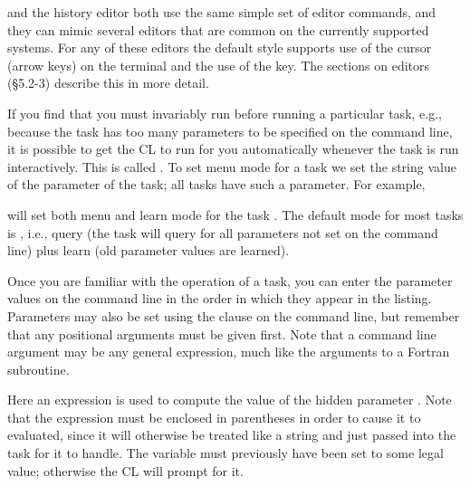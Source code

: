  and the history editor  both
use the same simple set of editor commands, and they can mimic several 
editors that are common on the currently supported systems.  For any
of these editors the default style supports use of the cursor (arrow keys)
on the terminal and the use of the  key.  The sections on
editors (\S 5.2-3) describe this in more detail.

If you find that you must invariably run  before running
a particular task, e.g., because the task has too many parameters to be
specified on the command line, it is possible to get the CL to run
 for you automatically whenever the task is run interactively.
This is called .  To set menu mode for a task we
set the string value of the  parameter of the task; all
tasks have such a parameter.  For example,

\begin{quotation}\noindent
{} 
\end{quotation}

\noindent
will set both menu and learn mode for the task .
The default mode for most tasks is , i.e., query (the task
will query for all parameters not set on the command line) plus learn
(old parameter values are learned).

Once you are familiar with the operation of a task, you can
enter the parameter values on the command line in the
order in which they appear in the  listing.
Parameters may also be set using the  clause on the
command line, but remember that any positional arguments must be given first.
Note that a command line argument may be any general expression, much like
the arguments to a Fortran subroutine.

\begin{quotation} \noindent
{} 
\end{quotation}

\noindent
Here an expression is used to compute the value of the
hidden parameter . Note that the expression must
be enclosed in parentheses in order to cause it to evaluated, since it
will otherwise be treated like a string and just passed into the task
for it to handle.  The variable  must previously have 
been set to some legal value; otherwise the CL will prompt for it.

